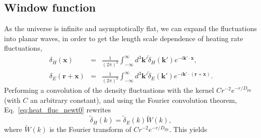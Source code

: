 \documentclass[numberedappendix]{emulateapj}
\begin{document}
{%

\subsection{Window function}
As the universe is infinite and asymptotically flat, we can expand the fluctuations into planar waves, in order to get the length scale dependence of heating rate fluctuations,
\begin{eqnarray}
  \label{eq:FT_delta}
  \delta_H(\mathbf{x})&=&\frac{1}{(2\pi)^3}\int_{-\infty}^{\infty} d^3\mathbf{k'} \tilde{\delta}_H(\mathbf{k'}) e^{-i\mathbf{k'}\cdot\mathbf{x}},\\ \nonumber
  \delta_E(\mathbf{r}+\mathbf{x})&=&\frac{1}{(2\pi)^3}\int_{-\infty}^{\infty} d^3\mathbf{k'} \tilde{\delta}_E(\mathbf{k'}) e^{-i\mathbf{k'}\cdot(\mathbf{r}+\mathbf{x})}.
\end{eqnarray}
Performing a convolution of the density fluctuations with the kernel $C r^{-2} e^{-r/D_{\mathrm{pp}}}$ (with $C$ an arbitrary constant), and using the Fourier convolution theorem, Eq.~\eqref{eq:heat_fluc_newt0} rewrites
\begin{equation}
   \label{eq:1}
\tilde{\delta}_H(k) = \tilde{\delta}_E(k) \tilde{W}(k),
 \end{equation}
where $\tilde{W}(k)$ is the Fourier transform of $C r^{-2} e^{-r/D_{\mathrm{pp}}}$. This yields



}
\end{document}
